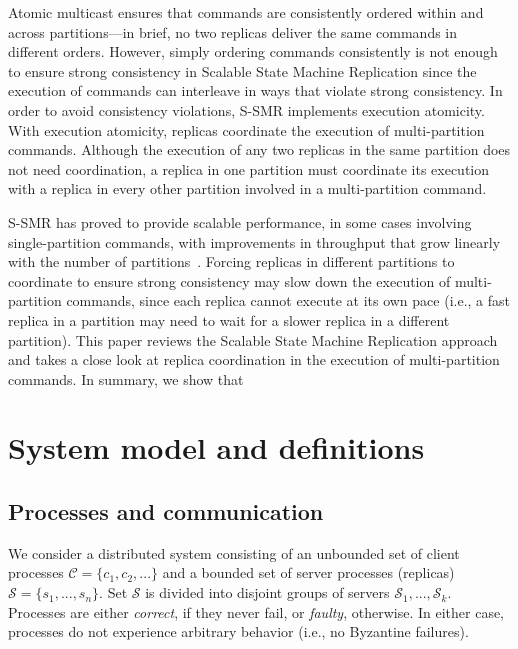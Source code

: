\documentclass[11pt]{article}
\newcommand{\ccm}{\mathcal{C}}
\newcommand{\ssm}{\mathcal{S}}
\begin{document}
Atomic multicast ensures that commands are consistently ordered within and across partitions---in brief, no two replicas deliver the same commands in different orders.
However, simply ordering commands consistently is not enough to ensure strong consistency in Scalable State Machine Replication since the execution of commands can interleave in ways that violate strong consistency.
In order to avoid consistency violations, S-SMR implements execution atomicity. 
With execution atomicity, replicas coordinate the execution of multi-partition commands.
Although the execution of any two replicas in the same partition does not need coordination, a replica in one partition must coordinate its execution with a replica in every other partition involved in a multi-partition command.

S-SMR has proved to provide scalable performance, in some cases involving single-partition commands, with improvements in throughput that grow linearly with the number of partitions~\cite{bezerra2014ssmr}.
Forcing replicas in different partitions to coordinate to ensure strong consistency may slow down the execution of multi-partition commands, since each replica cannot execute at its own pace (i.e., a fast replica in a partition may need to wait for a slower replica in a different partition).
%
This paper reviews the Scalable State Machine Replication approach and takes a close look at replica coordination in the execution of multi-partition commands.
In summary, we show that 


\clearpage
\section{System model and definitions}
\label{sec:sysmodel}

\subsection{Processes and communication}

We consider a distributed system consisting of an unbounded set of client processes $\ccm = \{c_1, c_2, ...\}$ and a bounded set of server processes (replicas) $\ssm = \{s_1, ..., s_n\}$.
Set $\ssm$ is divided into disjoint groups of servers $\ssm_1, ..., \ssm_k$.
Processes are either \emph{correct}, if they never fail, or \emph{faulty}, otherwise.
In either case, processes do not experience arbitrary behavior (i.e., no Byzantine failures).
\end{document}

